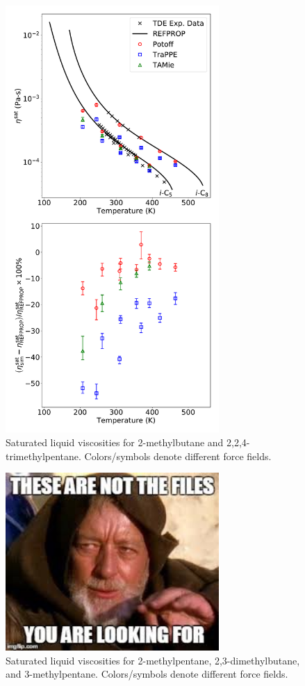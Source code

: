 \documentclass[preprint,review,12pt]{elsarticle}
\begin{document}
\begin{figure}[p!]
	\centering
	\includegraphics[width=3.2in]{compare_force_fields_IC5_IC8.pdf}
	\caption{Saturated liquid viscosities for 2-methylbutane and 2,2,4-trimethylpentane. Colors/symbols denote different force fields.}
	\label{fig:Saturation_IC5_IC8}
\end{figure} 


\begin{figure}[p!]
	\centering
	\includegraphics[width=3.2in]{empty_figure.jpg}
	\caption{Saturated liquid viscosities for 2-methylpentane, 2,3-dimethylbutane, and 3-methylpentane. Colors/symbols denote different force fields.}
	\label{fig:Saturation_IC6_23DMB_3MP}
\end{figure}
\end{document}
